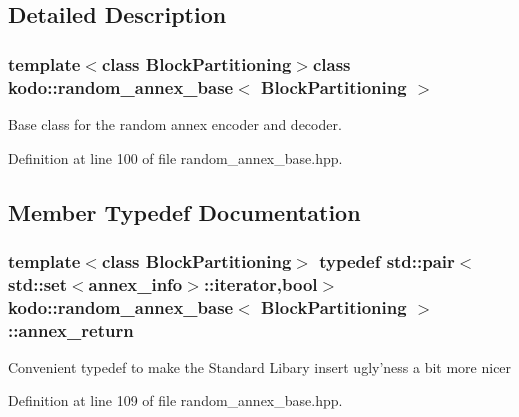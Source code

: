 \subsection{Detailed Description}
\subsubsection*{template$<$class Block\-Partitioning$>$class kodo\-::random\-\_\-annex\-\_\-base$<$ Block\-Partitioning $>$}

Base class for the random annex encoder and decoder. 

Definition at line 100 of file random\-\_\-annex\-\_\-base.\-hpp.



\subsection{Member Typedef Documentation}
\hypertarget{classkodo_1_1random__annex__base_abbc4827931452604ab1ea4546462c588}{
\subsubsection[{annex\-\_\-return}]{\setlength{\rightskip}{0pt plus 5cm}template$<$class Block\-Partitioning$>$ typedef std\-::pair$<$std\-::set$<${\bf annex\-\_\-info}$>$\-::iterator,bool$>$ {\bf kodo\-::random\-\_\-annex\-\_\-base}$<$ Block\-Partitioning $>$\-::{\bf annex\-\_\-return}}}\label{classkodo_1_1random__annex__base_abbc4827931452604ab1ea4546462c588}
Convenient typedef to make the Standard Libary insert ugly'ness a bit more nicer 

Definition at line 109 of file random\-\_\-annex\-\_\-base.\-hpp.



